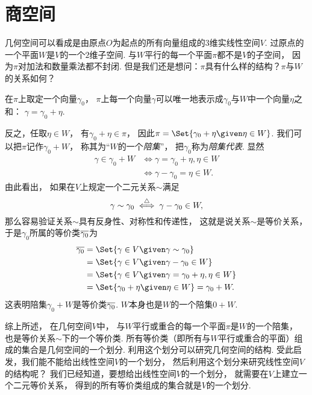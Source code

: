 \section{商空间}
几何空间可以看成是由原点\(O\)为起点的所有向量组成的\(3\)维实线性空间\(V\).
过原点的一个平面\(W\)是\(V\)的一个\(2\)维子空间.
与\(W\)平行的每一个平面\(\pi\)都不是\(V\)的子空间，
因为\(\pi\)对加法和数量乘法都不封闭.
但是我们还是想问：\(\pi\)具有什么样的结构？\(\pi\)与\(W\)的关系如何？

在\(\pi\)上取定一个向量\(\gamma_0\)，
\(\pi\)上每一个向量\(\gamma\)可以唯一地表示成\(\gamma_0\)与\(W\)中一个向量\(\eta\)之和：
\(\gamma=\gamma_0+\eta\).

反之，任取\(\eta\in W\)，
有\(\gamma_0+\eta\in\pi\)，
因此\(\pi=\Set{ \gamma_0+\eta \given \eta\in W }\).
我们可以把\(\pi\)记作\(\gamma_0+W\)，
称其为“\(W\)的一个\emph{陪集}”，
把\(\gamma_0\)称为\emph{陪集代表}.
显然\begin{align*}
	\gamma\in\gamma_0+W
	&\iff
	\gamma=\gamma_0+\eta,\eta\in W \\
	&\iff
	\gamma-\gamma_0=\eta\in W.
\end{align*}
由此看出，
如果在\(V\)上规定一个二元关系\(\sim\)满足\begin{equation*}
	\gamma\sim\gamma_0
	\overset{\triangle}{\iff}
	\gamma-\gamma_0\in W,
\end{equation*}
那么容易验证关系\(\sim\)具有反身性、对称性和传递性，
这就是说关系\(\sim\)是等价关系，
于是\(\gamma_0\)所属的等价类\(\EquivalenceClassO{\gamma_0}\)为\begin{align*}
	\EquivalenceClassO{\gamma_0}
	&=\Set{ \gamma\in V \given \gamma\sim\gamma_0 } \\
	&=\Set{ \gamma\in V \given \gamma-\gamma_0\in W } \\
	&=\Set{ \gamma\in V \given \gamma=\gamma_0+\eta,\eta\in W } \\
	&=\Set{ \gamma_0+\eta \given \eta\in W }
	=\gamma_0+W.
\end{align*}
这表明陪集\(\gamma_0+W\)是等价类\(\EquivalenceClassO{\gamma_0}\).
\(W\)本身也是\(W\)的一个陪集\(0+W\).

综上所述，
在几何空间\(V\)中，
与\(W\)平行或重合的每一个平面\(\pi\)是\(W\)的一个陪集，
也是等价关系\(\sim\)下的一个等价类.
所有等价类（即所有与\(W\)平行或重合的平面）组成的集合是几何空间的一个划分.
利用这个划分可以研究几何空间的结构.
受此启发，我们能不能给出线性空间\(V\)的一个划分，
然后利用这个划分来研究线性空间\(V\)的结构呢？
我们已经知道，要想给出线性空间\(V\)的一个划分，
就需要在\(V\)上建立一个二元等价关系，
得到的所有等价类组成的集合就是\(V\)的一个划分.

